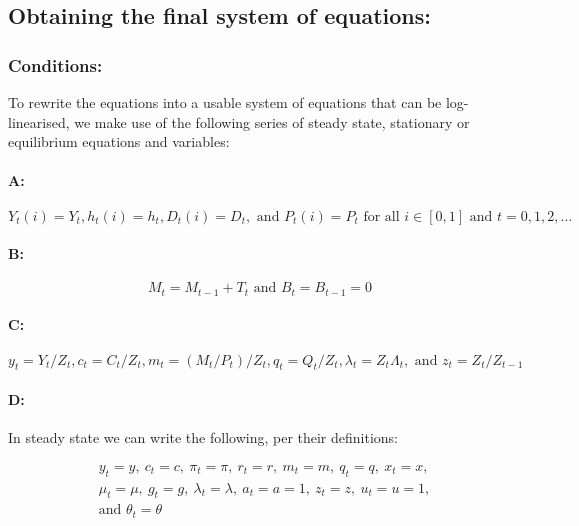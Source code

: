 \documentclass[11pt,preprint, authoryear]{elsarticle}
\numberwithin{equation}{section}
\numberwithin{figure}{section}
\numberwithin{table}{section}
\begin{document}
\hypertarget{obtaining-the-final-system-of-equations}{%
\subsection{Obtaining the final system of
equations:}\label{obtaining-the-final-system-of-equations}}

\hypertarget{conditions}{%
\subsubsection{Conditions:}\label{conditions}}

To rewrite the equations into a usable system of equations that can be
log-linearised, we make use of the following series of steady state,
stationary or equilibrium equations and variables:

\hypertarget{a}{%
\paragraph{A:}\label{a}}

\[ Y_{t}(i)=Y_{t}, h_{t}(i)=h_{t}, D_{t}(i)=D_{t}, \text { and } P_{t}(i)=P_{t} \text { for all } i \in[0,1] \text { and } t=0,1,2, \ldots \]

\hypertarget{b}{%
\paragraph{B:}\label{b}}

\[ M_{t}=M_{t-1}+T_{t} \text { and } B_{t}=B_{t-1}=0 \]

\hypertarget{c}{%
\paragraph{C:}\label{c}}

\[ y_{t}=Y_{t} / Z_{t}, c_{t}=C_{t} / Z_{t}, m_{t}=\left(M_{t} / P_{t}\right) / Z_{t}, q_{t}=Q_{t} / Z_{t}, \lambda_{t}=Z_{t} \Lambda_{t}, \text { and } z_{t}=Z_{t} / Z_{t-1} \]

\hypertarget{d}{%
\paragraph{D:}\label{d}}

In steady state we can write the following, per their definitions:

\[\begin{aligned} & y_{t}=y,\ c_{t}=c,\ \pi_{t}=\pi,\ r_{t}=r, \ m_{t}=m,\ q_{t}=q,\ x_{t}=x,\ \\ 
& \mu_{t}=\mu,\ g_{t}=g,\ \lambda_{t}=\lambda,\ a_{t}=a=1,\ z_{t}=z,\ u_{t}=u=1, \\ 
& \text {and } \theta_{t}=\theta \end{aligned}\]
\end{document}
